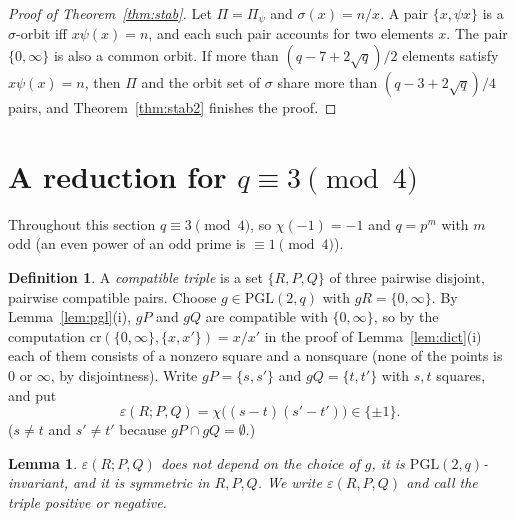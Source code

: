 \documentclass[11pt,a4paper]{article}
\newtheorem{lemma}[theorem]{Lemma}
\theoremstyle{definition}
\newtheorem{definition}[theorem]{Definition}
\theoremstyle{remark}
\newcommand{\PGL}{\mathrm{PGL}}
\newcommand{\cro}{\mathrm{cr}}
\begin{document}
\begin{proof}[Proof of Theorem~\ref{thm:stab}]
Let $\Pi=\Pi_\psi$ and $\sigma(x)=n/x$. A pair $\{x,\psi x\}$ is a $\sigma$-orbit iff $x\psi(x)=n$, and each
such pair accounts for two elements $x$. The pair $\{0,\infty\}$ is also a common orbit. If more than
$(q-7+2\sqrt q)/2$ elements satisfy $x\psi(x)=n$, then $\Pi$ and the orbit set of $\sigma$ share more than
$(q-3+2\sqrt q)/4$ pairs, and Theorem~\ref{thm:stab2} finishes the proof.
\end{proof}

\section{A reduction for $q\equiv3\pmod 4$}\label{sec:red}

Throughout this section $q\equiv3\pmod4$, so $\chi(-1)=-1$ and $q=p^m$ with $m$ odd (an even power of an odd prime is
$\equiv1\pmod 4$).

\begin{definition}
A \emph{compatible triple} is a set $\{R,P,Q\}$ of three pairwise disjoint, pairwise compatible pairs. Choose
$g\in\PGL(2,q)$ with $gR=\{0,\infty\}$. By Lemma~\ref{lem:pgl}(i), $gP$ and $gQ$ are compatible with $\{0,\infty\}$, so
by the computation $\cro(\{0,\infty\},\{x,x'\})=x/x'$ in the proof of Lemma~\ref{lem:dict}(i) each of them consists of a nonzero square
and a nonsquare (none of the points is $0$ or $\infty$, by disjointness). Write $gP=\{s,s'\}$ and $gQ=\{t,t'\}$ with
$s,t$ squares, and put
\[
\varepsilon(R;P,Q)=\chi\bigl((s-t)(s'-t')\bigr)\in\{\pm1\}.
\]
($s\neq t$ and $s'\ne t'$ because $gP\cap gQ=\emptyset$.)
\end{definition}

\begin{lemma}\label{lem:eps}
$\varepsilon(R;P,Q)$ does not depend on the choice of $g$, it is $\PGL(2,q)$-invariant, and it is symmetric in
$R,P,Q$. We write $\varepsilon(R,P,Q)$ and call the triple \emph{positive} or \emph{negative}.
\end{lemma}
\end{document}
